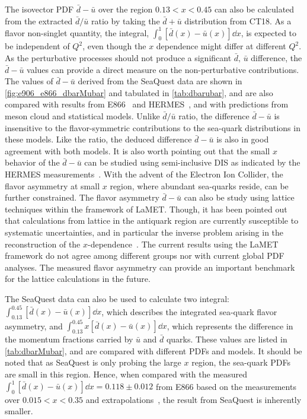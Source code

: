 \documentclass[reprint,aps,unsortedaddress,superscriptaddress,prc,floatfix,showpacs,linenumbers]{revtex4-2}
\begin{document}
The isovector PDF $\bar{d}-\bar{u}$ over the region $0.13<x<0.45$
can also be calculated from the extracted $\bar{d}/\bar{u}$ ratio by taking the $\bar{d}+\bar{u}$
distribution from CT18.
As a flavor non-singlet quantity, the integral, $\int^1_0 \left[\bar{d}\left(x\right) - \bar{u}\left(x\right)\right] \dd{x}$,
is expected to be independent of $Q^2$, even though the $x$ dependence might differ at different $Q^2$.
As the perturbative processes should not produce a significant $\bar{d},\,\bar{u}$ difference,
the $\bar{d}-\bar{u}$ values can provide a direct measure on the non-perturbative contributions.
The values of $\bar{d}-\bar{u}$ derived from the SeaQuest data are shown in \cref{fig:e906_e866_dbarMubar} and tabulated in \cref{tab:dbarubar},
and are also compared with results from E866~\cite{towell2001} and HERMES~\cite{ackerstaff1998},
and with predictions from meson cloud and statistical models.
Unlike $\bar{d}/\bar{u}$ ratio, the difference $\bar{d}-\bar{u}$ is insensitive to the flavor-symmetric contributions
to the sea-quark distributions in these models. Like the ratio, the deduced difference $\bar{d}-\bar{u}$ is also
in good agreement with both models.
It is also worth pointing out that the small $x$ behavior of the $\bar{d}-\bar{u}$ can be studied using
semi-inclusive DIS as indicated by the HERMES measurements~\cite{ackerstaff1998}.
With the advent of the Electron Ion Collider, the flavor asymmetry at small $x$ region, where abundant sea-quarks reside,
can be further constrained.
The flavor asymmetry $\bar{d}-\bar{u}$ can also be study using lattice techniques
within the framework of LaMET.
Though, it has been pointed out that calculations from lattice in the antiquark region are currently
susceptible to systematic uncertainties,
and in particular the inverse problem arising in the reconstruction of the $x$-dependence~\cite{constantinou2021}.
The current results using the LaMET framework do not agree among different groups nor with current global PDF analyses.
The measured flavor asymmetry can provide an important benchmark for the lattice calculations in the future.

The SeaQuest data can also be used to calculate two integral: $\int^{0.45}_{0.13} \left[\bar{d}\left(x\right) - \bar{u}\left(x\right) \right]\dd{x}$,
which describes the integrated sea-quark flavor asymmetry, and $\int^{0.45}_{0.13} x\left[\bar{d}\left(x\right) - \bar{u}\left(x\right) \right]\dd{x}$,
which represents the difference in the momentum fractions carried by $\bar{u}$ and $\bar{d}$ quarks.
These values are listed in \cref{tab:dbarMubar}, and are compared with different PDFs and models.
It should be noted that as SeaQuest is only probing the large $x$ region, the sea-quark PDFs are small in this region.
Hence, when compared with the measured $\int^{1}_{0} \left[\bar{d}\left(x\right) - \bar{u}\left(x\right) \right]\dd{x}=0.118\pm 0.012$
from E866 based on the measurements over $0.015<x<0.35$ and extrapolations~\cite{towell2001},
the result from SeaQuest is inherently smaller.
\end{document}
